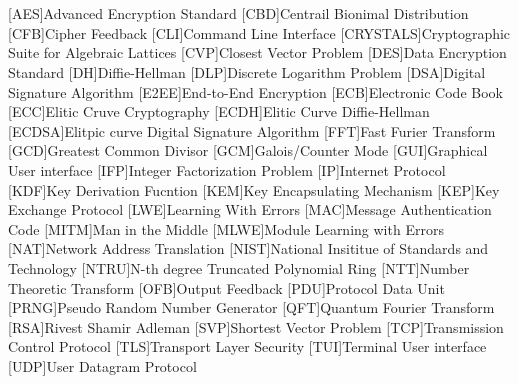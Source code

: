 \cleardoublepage
\chapter*{\listofabbrevname}
{}

\begin{acronym}[mmmmmmm]
	[AES]{Advanced Encryption Standard}
	[CBD]{Centrail Bionimal Distribution}
	[CFB]{Cipher Feedback}
	[CLI]{Command Line Interface}
	[CRYSTALS]{Cryptographic Suite for Algebraic Lattices}
	[CVP]{Closest Vector Problem}
	[DES]{Data Encryption Standard}
	[DH]{Diffie-Hellman}
	[DLP]{Discrete Logarithm Problem}
	[DSA]{Digital Signature Algorithm}
	[E2EE]{End-to-End Encryption}
	[ECB]{Electronic Code Book}
	[ECC]{Elitic Cruve Cryptography}
	[ECDH]{Elitic Curve Diffie-Hellman}
	[ECDSA]{Elitpic curve Digital Signature Algorithm}
	[FFT]{Fast Furier Transform}
	[GCD]{Greatest Common Divisor}
	[GCM]{Galois/Counter Mode}
	[GUI]{Graphical User interface}
	[IFP]{Integer Factorization Problem}
	[IP]{Internet Protocol}
	[KDF]{Key Derivation Fucntion}
	[KEM]{Key Encapsulating Mechanism}
	[KEP]{Key Exchange Protocol}
	[LWE]{Learning With Errors}
	[MAC]{Message Authentication Code}
	[MITM]{Man in the Middle}
	[MLWE]{Module Learning with Errors}
	[NAT]{Network Address Translation}
	[NIST]{National Insititue of Standards and Technology}
	[NTRU]{N-th degree Truncated Polynomial Ring}
	[NTT]{Number Theoretic Transform}
	[OFB]{Output Feedback}
	[PDU]{Protocol Data Unit}
	[PRNG]{Pseudo Random Number Generator}
	[QFT]{Quantum Fourier Transform}
	[RSA]{Rivest Shamir Adleman}
	[SVP]{Shortest Vector Problem}
	[TCP]{Transmission Control Protocol}
	[TLS]{Transport Layer Security}
	[TUI]{Terminal User interface}
	[UDP]{User Datagram Protocol}
\end{acronym}
